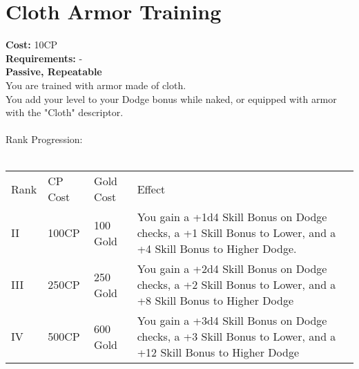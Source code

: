 \section{Cloth Armor Training}\label{perk:clothArmorTraining}
\textbf{Cost:} 10CP\\
\textbf{Requirements:} -\\
\textbf{Passive, Repeatable}\\
You are trained with armor made of cloth.\\
You add your level to your Dodge bonus while naked, or equipped with armor with the "Cloth" descriptor.\\
\\

Rank Progression:\\
\\
\begin{tabular}{l | l | l | l}
	Rank & CP Cost & Gold Cost & Effect\\
	II & 100CP & 100 Gold & You gain a +1d4 Skill Bonus on Dodge checks, a +1 Skill Bonus to Lower, and a +4 Skill Bonus to Higher Dodge.\\
	III & 250CP & 250 Gold & You gain a +2d4 Skill Bonus on Dodge checks, a +2 Skill Bonus to Lower, and a +8 Skill Bonus to Higher Dodge\\
	IV & 500CP & 600 Gold & You gain a +3d4 Skill Bonus on Dodge checks, a +3 Skill Bonus to Lower, and a +12 Skill Bonus to Higher Dodge\\
\end{tabular}